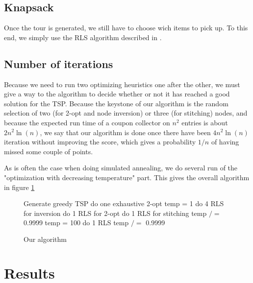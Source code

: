 \documentclass[fontsize=9pt,twocolumns,enabledeprecatedfontcommands]{scrartcl}
\begin{document}
\subsection{Knapsack}
Once the tour is generated, we still have to choose wich items to pick up. To this end, we simply use the RLS algorithm described in \cite{Polyakovskiy}.

\subsection{Number of iterations}
Because we need to run two optimizing heuristics one after the other, we must give a way to the algorithm to decide whether or not it has reached a good solution for the TSP. Because the keystone of our algorithm is the random selection of two (for 2-opt and node inversion) or three (for stitching) nodes, and because the expected run time of a coupon collector on $n^2$ entries is about $2n^2\ln(n)$, we say that our algorithm is done once there have been $4n^2\ln(n)$ iteration without improving the score, which gives a probability $1/n$ of having missed some couple of points.

As is often the case when doing simulated annealing, we do several run of the "optimization with decreasing temperature" part. This gives the overall algorithm in figure \ref{algo}

\begin{figure}
\begin{algorithmic}
	\State Generate greedy TSP
	\State do one exhaustive 2-opt
	\State temp = 1
	\State do 4 RLS for inversion
	\State do 1 RLS for 2-opt
	\State do 1 RLS for stitching
	\State temp $/=$ 0.9999
	\EndWhile
	\EndFor
{}
\State temp = 100	
	\State do 1 RLS
	\State temp $/=$ 0.9999
	\EndWhile
	\EndFor

\end{algorithmic}
\label{algo}
\caption{Our algorithm}
\end{figure} 

\section{Results}






\end{document}
